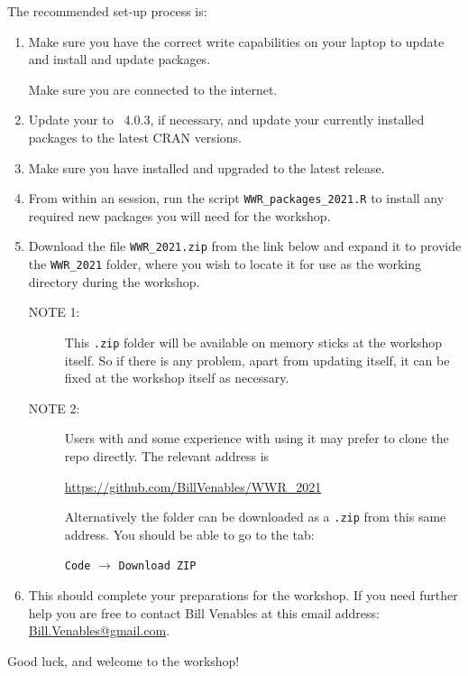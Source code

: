 \documentclass[12pt]{article}
\begin{document}
The recommended set-up process is:
  \begin{enumerate}
  \item Make sure you have the correct write capabilities on your
    laptop to update \R and install and update packages.

    Make sure you are connected to the internet.
  \item Update your \R to \R~4.0.3, if necessary, and update your
    currently installed packages to the latest CRAN versions.
    
  \item Make sure you have \RStudio installed and upgraded to the
    latest release.
    
  \item From within an \R session, run the script
    \verb|WWR_packages_2021.R| to install any required new packages
    you will need for the workshop.
    
  \item Download the file \verb|WWR_2021.zip| from the link below and
    expand it to provide the \verb|WWR_2021| folder, where you wish to
    locate it for use as the working directory during the workshop.
    \begin{description}
    \item[NOTE 1:] This {\tt .zip} folder will be
      available on memory sticks at the workshop itself.  So if there
      is any problem, apart from updating \R itself, it can be fixed
      at the workshop itself as necessary.
    \item[NOTE 2:] Users with \git and some experience with using it
      may prefer to clone the \github repo directly.  The
      relevant address is
      \begin{center}
        \url{https://github.com/BillVenables/WWR_2021}
      \end{center}
      Alternatively the folder can be downloaded as a \verb|.zip| from
      this same address.  You should be able to go to the tab:
      \begin{center}
        \texttt{Code} $\longrightarrow$ \texttt{Download ZIP}
      \end{center}

    \end{description}
  \item This should complete your preparations for the workshop.  If
    you need further help you are free to contact Bill Venables at
    this email address:
    \href{mailto:Bill.Venables@gmail.com}{Bill.Venables@gmail.com}.
 
  \end{enumerate}

Good luck, and welcome to the workshop!
\end{document}
